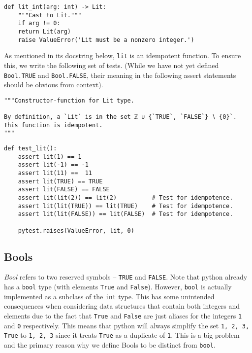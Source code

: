 \documentclass[11pt]{article}
\begin{document}
\begin{verbatim}
def lit_int(arg: int) -> Lit:
    """Cast to Lit."""
    if arg != 0:
	return Lit(arg)
    raise ValueError('Lit must be a nonzero integer.')
\end{verbatim}

As mentioned in its docstring below, \texttt{lit} is an idempotent function. To
ensure this, we write the following set of tests.  (While we have not
yet defined \texttt{Bool.TRUE} and \texttt{Bool.FALSE}, their meaning in the
following assert statements should be obvious from context).

\begin{verbatim}
"""Constructor-function for Lit type.

By definition, a `Lit` is in the set ℤ ∪ {`TRUE`, `FALSE`} ∖ {0}`.
This function is idempotent.
"""
\end{verbatim}

\begin{verbatim}
def test_lit():
    assert lit(1) == 1
    assert lit(-1) == -1
    assert lit(11) ==  11
    assert lit(TRUE) == TRUE
    assert lit(FALSE) == FALSE
    assert lit(lit(2)) == lit(2)          # Test for idempotence.
    assert lit(lit(TRUE)) == lit(TRUE)    # Test for idempotence.
    assert lit(lit(FALSE)) == lit(FALSE)  # Test for idempotence.

    pytest.raises(ValueError, lit, 0)
\end{verbatim}

\subsection{Bools}
\label{sec:orgc16e7e4}
\emph{Bool} refers to two reserved symbols -- \texttt{TRUE} and \texttt{FALSE}. Note that
python already has a \texttt{bool} type (with elements \texttt{True} and \texttt{False}).
However, \texttt{bool} is actually implemented as a subclass of the \texttt{int} type.
This has some unintended consequences when considering data structures that
contain both integers and elements due to the fact that \texttt{True} and \texttt{False}
are just aliases for the integers \texttt{1} and \texttt{0} respectively. This means that
python will always simplify the set \texttt{{1, 2, 3, True}} to
\texttt{{1, 2, 3}} since it treats \texttt{True} as a duplicate of \texttt{1}. This is
a big problem and the primary reason why we define Bools to be distinct
from \texttt{bool}.
\end{document}
